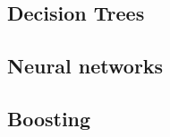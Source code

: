 \documentclass{sig-alternate}
\begin{document}






\subsection{Decision Trees}

\subsection{Neural networks}

\subsection{Boosting}
\end{document}
